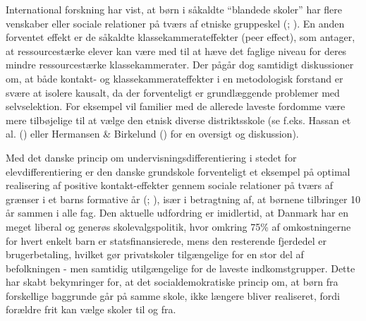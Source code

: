 \documentclass[
]{book}
\begin{document}
International forskning har vist, at børn i såkaldte ``blandede skoler'' har flere venskaber eller sociale relationer på tværs af etniske gruppeskel (; ). En anden forventet effekt er de såkaldte klassekammerateffekter (peer effect), som antager, at ressourcestærke elever kan være med til at hæve det faglige niveau for deres mindre ressourcestærke klassekammerater. Der pågår dog samtidigt diskussioner om, at både kontakt- og klassekammerateffekter i en metodologisk forstand er svære at isolere kausalt, da der forventeligt er grundlæggende problemer med selvselektion. For eksempel vil familier med de allerede laveste fordomme være mere tilbøjelige til at vælge den etnisk diverse distriktsskole (se f.eks. Hassan et al. () eller Hermansen \& Birkelund () for en oversigt og diskussion).

Med det danske princip om undervisningsdifferentiering i stedet for elevdifferentiering er den danske grundskole forventeligt et eksempel på optimal realisering af positive kontakt-effekter gennem sociale relationer på tværs af grænser i et barns formative år (; ), især i betragtning af, at børnene tilbringer 10 år sammen i alle fag. Den aktuelle udfordring er imidlertid, at Danmark har en meget liberal og generøs skolevalgspolitik, hvor omkring 75\% af omkostningerne for hvert enkelt barn er statsfinansierede, mens den resterende fjerdedel er brugerbetaling, hvilket gør privatskoler tilgængelige for en stor del af befolkningen - men samtidig utilgængelige for de laveste indkomstgrupper. Dette har skabt bekymringer for, at det socialdemokratiske princip om, at børn fra forskellige baggrunde går på samme skole, ikke længere bliver realiseret, fordi forældre frit kan vælge skoler til og fra.
\end{document}
